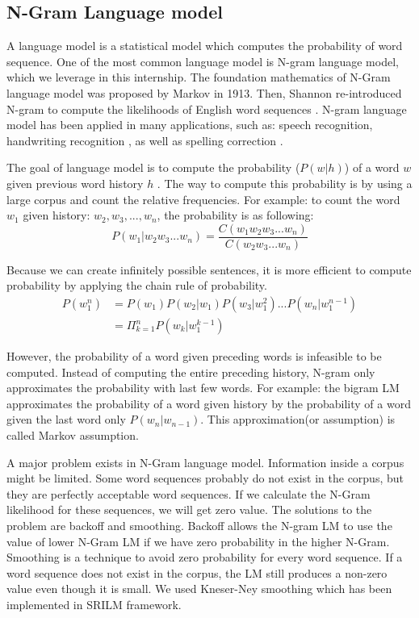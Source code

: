 \subsection{N-Gram Language model}


A language model is a statistical model which computes the probability of word sequence. One of the most common language model is N-gram language model, which we leverage in this internship. The foundation mathematics of N-Gram language model was proposed by Markov in 1913. Then, Shannon re-introduced N-gram to compute the likelihoods of English word sequences \cite{Shannon:2001:MTC:584091.584093}. N-gram language model has been applied in many applications, such as: speech recognition\cite{Woodland2015}, handwriting recognition \cite{Poznanski2016}, as well as spelling correction \cite{Kukich1992}.

The goal of language model is to compute the probability ($P(w|h)$) of a word $w$ given previous word history $h$ . The way to compute this probability is by using a large corpus and count the relative frequencies. For example: to count the word $w_{1}$ given history: $w_{2}, w_{3}, ..., w_{n}$, the probability is as following:
\begin{equation}
P(w_{1}|w_{2}w_{3}...w_{n})= \frac{C(w_{1}w_{2}w_{3}...w_{n})}{C(w_{2}w_{3}...w_{n})}
\end{equation}

Because we can create infinitely possible sentences, it is more efficient to compute probability by applying the chain rule of probability. 
\begin{align*}
P(w_{1}^{n}) & =P(w_{1})P(w_{2}|w_{1})P(w_{3}|w_{1}^{2})...P(w_{n}|w_{1}^{n-1}) \\
& = \Pi_{k=1}^{n} P(w_{k}|w_{1}^{k-1})
\end{align*}

However, the probability of a word given preceding words is infeasible to be computed. Instead of computing the entire preceding history, N-gram only approximates the probability with last few words. For example: the bigram LM approximates the probability of a word given history by the probability of a word given the last word only $P(w_{n}|w_{n-1})$.  This approximation(or assumption) is called Markov assumption.

A major problem exists in N-Gram language model. Information inside a corpus might be limited. Some word sequences probably do not exist in the corpus, but they are perfectly acceptable word sequences. If we calculate the N-Gram likelihood for these sequences, we will get zero value. The solutions to the problem are backoff and smoothing. Backoff allows the N-gram LM to use the value of lower N-Gram LM if we have zero probability in the higher N-Gram.  Smoothing is a technique to avoid  zero probability for every word sequence. If a word sequence does not exist in the corpus, the LM still produces a non-zero value even though it is small. We used Kneser-Ney smoothing \cite{KneserNey1993} which has been implemented in SRILM framework.


